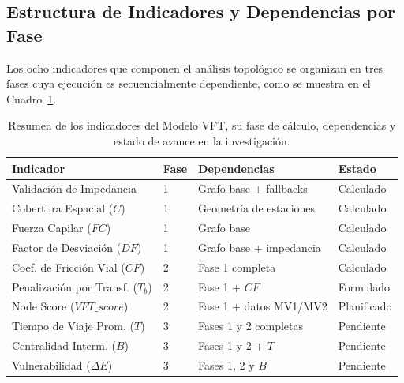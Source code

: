 \subsection{Estructura de Indicadores y Dependencias por Fase}
\label{subsec:tabla-indicadores}

Los ocho indicadores que componen el análisis topológico se organizan en tres
fases cuya ejecución es secuencialmente dependiente, como se muestra en el
Cuadro~\ref{tab:resumen-indicadores-cap5}.

\begin{table}[H]
    \centering
    \caption[Resumen de indicadores del Modelo VFT por fase]{Resumen de los
    indicadores del Modelo VFT, su fase de cálculo, dependencias y estado
    de avance en la investigación.}
    \label{tab:resumen-indicadores-cap5}
    \begin{tabularx}{\textwidth}{|l|l|X|l|}
        \hline
        \textbf{Indicador} & \textbf{Fase} & \textbf{Dependencias} & \textbf{Estado} \\
        \hline
        Validación de Impedancia    & 1 & Grafo base + fallbacks            & Calculado \\
        Cobertura Espacial ($C$)    & 1 & Geometría de estaciones           & Calculado \\
        Fuerza Capilar ($FC$)       & 1 & Grafo base                        & Calculado \\
        Factor de Desviación ($DF$) & 1 & Grafo base + impedancia           & Calculado \\
        \hline
        Coef. de Fricción Vial ($CF$)  & 2 & Fase 1 completa                & Calculado \\
        Penalización por Transf. ($T_b$) & 2 & Fase 1 + $CF$              & Formulado \\
        Node Score ($VFT\_score$)   & 2 & Fase 1 + datos MV1/MV2            & Planificado \\
        \hline
        Tiempo de Viaje Prom. ($T$) & 3 & Fases 1 y 2 completas             & Pendiente \\
        Centralidad Interm. ($B$)   & 3 & Fases 1 y 2 + $T$                 & Pendiente \\
        Vulnerabilidad ($\Delta E$) & 3 & Fases 1, 2 y $B$                  & Pendiente \\
        \hline
    \end{tabularx}
\end{table}
